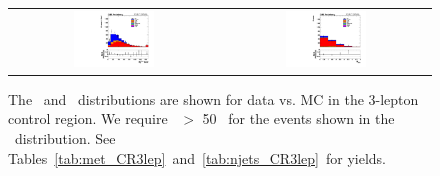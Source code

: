 \begin{figure}[!htb]
\begin{center}
\begin{tabular}{cc}
\includegraphics[width=0.4\textwidth]{bkgd/figs/h_metall_ll_signalregion_CR3lep_passtrig.pdf} &
\includegraphics[width=0.4\textwidth]{bkgd/figs/h_njtm50_ll_signalregion_CR3lep_passtrig.pdf} \\
\end{tabular}
\caption{The \MET\ and \nj\ distributions are shown for data vs. MC in the 3-lepton control region.
  We require \MET\ $>$ 50 \gev\ for the events shown in the \nj\ distribution.
See Tables~\ref{tab:met_CR3lep}~and~\ref{tab:njets_CR3lep}~for yields.
\label{fig:bkg_CR3lep}
}
\end{center}
\end{figure}



